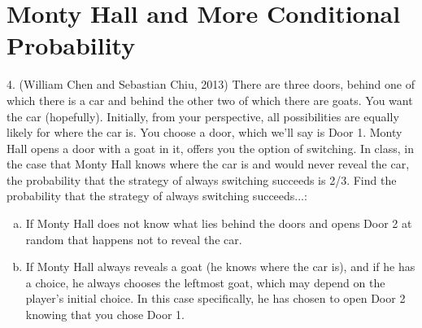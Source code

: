\documentclass{article}
\begin{document}
\section{Monty Hall and More Conditional Probability}

4. (William Chen and Sebastian Chiu, 2013) There are three doors, behind one of which there is a car and behind the other two of which there are goats. You want the car (hopefully). Initially, from your perspective, all possibilities are equally likely for where the car is. You choose a door, which we'll say is Door 1. Monty Hall opens a door with a goat in it, offers you the option of switching. In class, in the case that Monty Hall knows where the car is and would never reveal the car, the probability that the strategy of always switching succeeds is 2/3. Find the probability that the strategy of always switching succeeds...:

\begin{enumerate}[(a)]
    \item  If Monty Hall does not know what lies behind the doors and opens Door 2 at random that happens not to reveal the car.
    
    
    \item If Monty Hall always reveals a goat (he knows where the car is), and if he has a choice, he always chooses the leftmost goat, which may depend on the player's initial choice. In this case specifically, he has chosen to open Door 2 knowing that you chose Door 1.
    
    
\end{enumerate}
\end{document}
